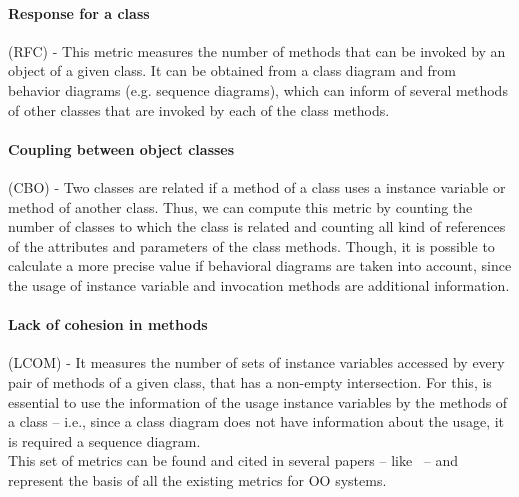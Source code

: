 \paragraph{Response for a class} (RFC) - This metric measures the number of methods that can be invoked by an object of a given class. It can be obtained from a class diagram and from behavior diagrams (e.g. sequence diagrams), which can inform of several methods of other classes that are invoked by each of the class methods.

\paragraph{Coupling between object classes} (CBO) - Two classes are related if a method of a class uses a instance variable or method of another class.
Thus, we can compute this metric by counting the number of classes to which the class is related and counting all kind of references of the attributes and parameters of the class methods.
Though, it is possible to calculate a more precise value if behavioral diagrams are taken into account, since the usage of instance variable and invocation methods are additional information.

\paragraph{Lack of cohesion in methods} (LCOM) - It measures the number of sets of instance variables accessed by every pair of methods of a given class, that has a non-empty intersection. For this, is essential to use the information of the usage instance variables by the methods of a class -- i.e., since a class diagram does not have information about the usage, it is required a sequence diagram.\\

This set of metrics can be found and cited in several papers -- like~\cite{Power2} -- and represent the basis of all the existing metrics for OO systems.

